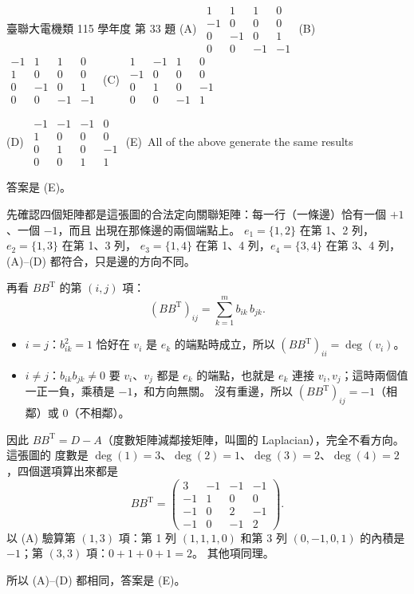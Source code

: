 \begin{pastexam}[label={px:ust-115-ee-ds-33}]{臺聯大電機類 115 學年度 第 33 題}
\medskip
(A)~$\begin{matrix}1&1&1&0\\-1&0&0&0\\0&-1&0&1\\0&0&-1&-1\end{matrix}$\qquad
(B)~$\begin{matrix}-1&1&1&0\\1&0&0&0\\0&-1&0&1\\0&0&-1&-1\end{matrix}$\qquad
(C)~$\begin{matrix}1&-1&1&0\\-1&0&0&0\\0&1&0&-1\\0&0&-1&1\end{matrix}$

\medskip
(D)~$\begin{matrix}-1&-1&-1&0\\1&0&0&0\\0&1&0&-1\\0&0&1&1\end{matrix}$\qquad
(E)~All of the above generate the same results
\end{pastexam}

\begin{pastsoln}
答案是 (E)。

先確認四個矩陣都是這張圖的合法定向關聯矩陣：每一行（一條邊）恰有一個 $+1$、一個 $-1$，而且
出現在那條邊的兩個端點上。 $e_1 = \{1, 2\}$ 在第 1、2 列，$e_2 = \{1, 3\}$ 在第 1、3 列，
$e_3 = \{1, 4\}$ 在第 1、4 列，$e_4 = \{3, 4\}$ 在第 3、4 列，(A)--(D) 都符合，只是邊的方向不同。

再看 $BB^{\mathrm T}$ 的第 $(i, j)$ 項：
\[
(BB^{\mathrm T})_{ij} = \sum_{k=1}^{m} b_{ik}\, b_{jk} .
\]
\begin{itemize}
\item $i = j$：$b_{ik}^2 = 1$ 恰好在 $v_i$ 是 $e_k$ 的端點時成立，所以 $(BB^{\mathrm T})_{ii} =
\deg(v_i)$。
\item $i \ne j$：$b_{ik} b_{jk} \ne 0$ 要 $v_i$、$v_j$ 都是 $e_k$ 的端點，也就是 $e_k$ 連接
$v_i, v_j$；這時兩個值一正一負，乘積是 $-1$，和方向無關。 沒有重邊，所以
$(BB^{\mathrm T})_{ij} = -1$（相鄰）或 $0$（不相鄰）。
\end{itemize}
因此 $BB^{\mathrm T} = D - A$（度數矩陣減鄰接矩陣，叫圖的 Laplacian），完全不看方向。 這張圖的
度數是 $\deg(1) = 3$、$\deg(2) = 1$、$\deg(3) = 2$、$\deg(4) = 2$，四個選項算出來都是
\[
BB^{\mathrm T} = \begin{pmatrix} 3 & -1 & -1 & -1 \\ -1 & 1 & 0 & 0 \\ -1 & 0 & 2 & -1 \\ -1 & 0 & -1 & 2 \end{pmatrix} .
\]
以 (A) 驗算第 $(1,3)$ 項：第 1 列 $(1, 1, 1, 0)$ 和第 3 列 $(0, -1, 0, 1)$ 的內積是 $-1$；第
$(3,3)$ 項：$0 + 1 + 0 + 1 = 2$。 其他項同理。

所以 (A)--(D) 都相同，答案是 (E)。
\end{pastsoln}

